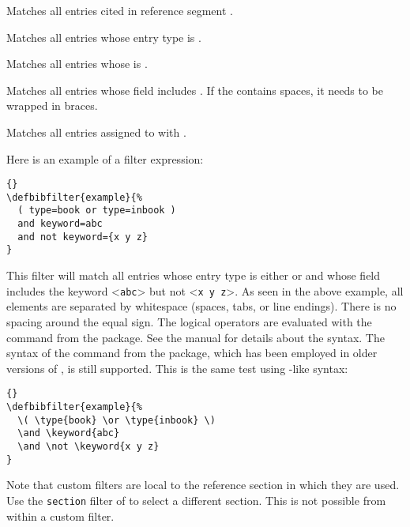 \begin{optionlist*}


Matches all entries cited in reference segment .


Matches all entries whose entry type is .


Matches all entries whose  is .


Matches all entries whose  field includes . If the  contains spaces, it needs to be wrapped in braces.


Matches all entries assigned to  with .

\end{optionlist*}

Here is an example of a filter expression:

\begin{lstlisting}[style=latex,keywords={and,or,not,type,keyword}]{}
\defbibfilter{example}{%
  ( type=book or type=inbook )
  and keyword=abc
  and not keyword={x y z}
}
\end{lstlisting}
%
This filter will match all entries whose entry type is either  or  and whose  field includes the keyword <\texttt{abc}> but not <\texttt{x y z}>. As seen in the above example, all elements are separated by whitespace (spaces, tabs, or line endings). There is no spacing around the equal sign. The logical operators are evaluated with the  command from the  package. See the  manual for details about the syntax. The syntax of the  command from the  package, which has been employed in older versions of \biblatex, is still supported. This is the same test using -like syntax:

\begin{lstlisting}[style=ifthen,morekeywords={\\type,\\keyword}]{}
\defbibfilter{example}{%
  \( \type{book} \or \type{inbook} \)
  \and \keyword{abc}
  \and \not \keyword{x y z}
}
\end{lstlisting}
%
Note that custom filters are local to the reference section in which they are used. Use the \texttt{section} filter of  to select a different section. This is not possible from within a custom filter.

